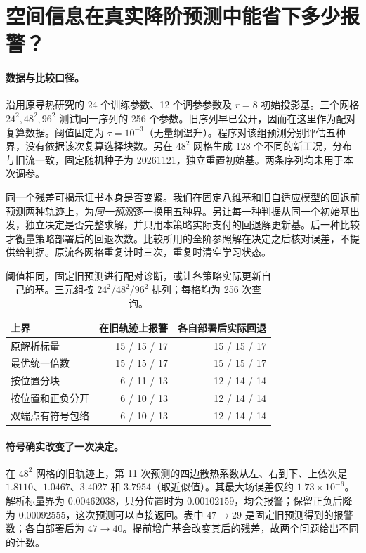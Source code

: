 \section{空间信息在真实降阶预测中能省下多少报警？}
\paragraph{数据与比较口径。}
沿用原导热研究的 24 个训练参数、12 个调参参数及 $r=8$ 初始投影基。三个网格 $24^2,48^2,96^2$ 测试同一序列的 256 个参数。旧序列早已公开，因而在这里作为配对复算数据。阈值固定为 $\tau=10^{-3}$（无量纲温升）。程序对该组预测分别评估五种界，没有依据该次复算选择块数。另在 $48^2$ 网格生成 128 个不同的新工况，分布与旧流一致，固定随机种子为 20261121，独立重置初始基。两条序列均未用于本次调参。

同一个残差可揭示证书本身是否变紧。我们在固定八维基和旧自适应模型的回退前预测两种轨迹上，为\emph{同一预测}逐一换用五种界。另让每一种判据从同一个初始基出发，独立决定是否完整求解，并只用本策略实际支付的回退解更新基。后一种比较才衡量策略部署后的回退次数。比较所用的全阶参照解在决定之后核对误差，不提供给判据。原流各网格重复计时三次，重复时清空学习状态。

\begin{table}[ht]\centering\small
\caption{阈值相同，固定旧预测进行配对诊断，或让各策略实际更新自己的基。三元组按 $24^2/48^2/96^2$ 排列；每格均为 256 次查询。}
\begin{tabular}{lrr}\toprule
上界 & 在旧轨迹上报警 & 各自部署后实际回退\\\midrule
原解析标量 & 15 / 15 / 17 & 15 / 15 / 17\\
最优统一倍数 & 15 / 15 / 17 & 15 / 15 / 17\\
按位置分块 & 6 / 11 / 13 & 12 / 14 / 14\\
按位置和正负分开 & 6 / 10 / 13 & 12 / 14 / 14\\
双端点有符号包络 & 6 / 10 / 13 & 12 / 14 / 14\\\bottomrule\end{tabular}
\end{table}

\paragraph{符号确实改变了一次决定。}
在 $48^2$ 网格的旧轨迹上，第 11 次预测的四边散热系数从左、右到下、上依次是 $1.8110$、$1.0467$、$3.4027$ 和 $3.7954$（取近似值）。其最大场误差仅约 $1.73\times10^{-6}$。解析标量界为 $0.00462038$，只分位置时为 $0.00102159$，均会报警；保留正负后降为 $0.00092555$，这次预测可以直接返回。表中 $47\to29$ 是固定旧预测得到的报警数；各自部署后为 $47\to40$。提前增广基会改变其后的残差，故两个问题给出不同的计数。


